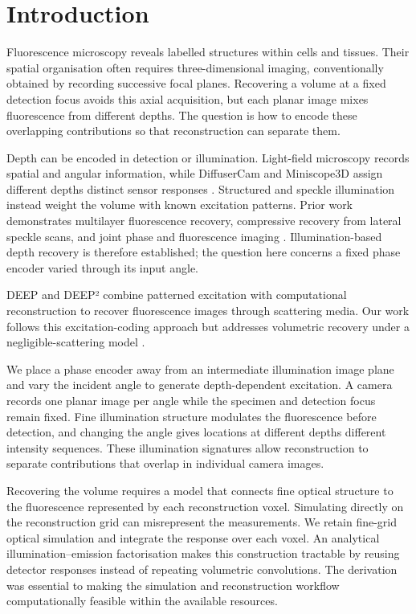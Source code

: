 \section{Introduction}

Fluorescence microscopy reveals labelled structures within cells and tissues. Their spatial organisation often requires three-dimensional imaging, conventionally obtained by recording successive focal planes. Recovering a volume at a fixed detection focus avoids this axial acquisition, but each planar image mixes fluorescence from different depths. The question is how to encode these overlapping contributions so that reconstruction can separate them.

Depth can be encoded in detection or illumination. Light-field microscopy records spatial and angular information, while DiffuserCam and Miniscope3D assign different depths distinct sensor responses \cite{broxton2013,antipa2018,yanny2020}. Structured and speckle illumination instead weight the volume with known excitation patterns. Prior work demonstrates multilayer fluorescence recovery, compressive recovery from lateral speckle scans, and joint phase and fluorescence imaging \cite{guo2016,pascucci2019,yeh2019}. Illumination-based depth recovery is therefore established; the question here concerns a fixed phase encoder varied through its input angle.

DEEP and DEEP² combine patterned excitation with computational reconstruction to recover fluorescence images through scattering media. Our work follows this excitation-coding approach but addresses volumetric recovery under a negligible-scattering model \cite{zheng2021,wijethilake2023}.

We place a phase encoder away from an intermediate illumination image plane and vary the incident angle to generate depth-dependent excitation. A camera records one planar image per angle while the specimen and detection focus remain fixed. Fine illumination structure modulates the fluorescence before detection, and changing the angle gives locations at different depths different intensity sequences. These illumination signatures allow reconstruction to separate contributions that overlap in individual camera images.

Recovering the volume requires a model that connects fine optical structure to the fluorescence represented by each reconstruction voxel. Simulating directly on the reconstruction grid can misrepresent the measurements. We retain fine-grid optical simulation and integrate the response over each voxel. An analytical illumination--emission factorisation makes this construction tractable by reusing detector responses instead of repeating volumetric convolutions. The derivation was essential to making the simulation and reconstruction workflow computationally feasible within the available resources.

